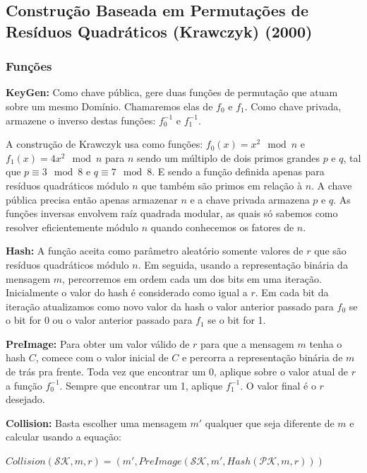 \documentclass[a4paper]{article}
\begin{document}
    \subsection{Construção Baseada em Permutações de Resíduos Qua\-drá\-ti\-cos
      (Krawczyk) (2000) \cite{krawczyk}}
    
    \subsubsection{Funções}
    
    \textbf{KeyGen: }Como chave pública, gere duas funções de permutação
    que atuam sobre um mesmo Domínio. Chamaremos elas de $f_0$ e
    $f_1$. Como chave privada, armazene o inverso destas funções:
    $f_0^{-1}$ e $f_1^{-1}$.
    
    A construção de Krawczyk usa como funções: $f_0(x) = x^2 \mod n$ e
    $f_1(x) = 4x^2 \mod n$ para $n$ sendo um múltiplo de dois primos
    grandes $p$ e $q$, tal que $p \equiv 3 \mod 8$ e $q \equiv 7 \mod
    8$. E sendo a função definida apenas para resíduos quadráticos módulo
    $n$ que também são primos em relação à $n$. A chave pública precisa
    então apenas armazenar $n$ e a chave privada armazena $p$ e $q$. As
    funções inversas envolvem raíz quadrada modular, as quais só sabemos
    como resolver eficientemente módulo $n$ quando conhecemos os fatores
    de $n$.
    
    \textbf{Hash:} A função aceita como parâmetro aleatório somente
    valores de $r$ que são resíduos quadráticos módulo $n$. Em seguida,
    usando a representação binária da mensagem $m$, percorremos em ordem
    cada um dos bits em uma iteração. Inicialmente o valor do hash é
    considerado como igual a $r$. Em cada bit da iteração atualizamos como
    novo valor da hash o valor anterior passado para $f_0$ se o bit for 0
    ou o valor anterior passado para $f_1$ se o bit for 1.
    
    \textbf{PreImage:} Para obter um valor válido de $r$ para que a
    mensagem $m$ tenha o hash $C$, comece com o valor inicial de $C$ e
    percorra a representação binária de $m$ de trás pra frente. Toda vez
    que encontrar um 0, aplique sobre o valor atual de $r$ a função
    $f_0^{-1}$. Sempre que encontrar um 1, aplique $f_1^{-1}$. O valor
    final é o $r$ desejado.
    
    \textbf{Collision:} Basta escolher uma mensagem $m'$ qualquer que seja
    diferente de $m$ e calcular usando a equação:
    
    $Collision(\mathcal{SK}, m, r) = (m', PreImage(\mathcal{SK}, m',
    Hash(\mathcal{PK}, m, r)))$
    
\end{document}
